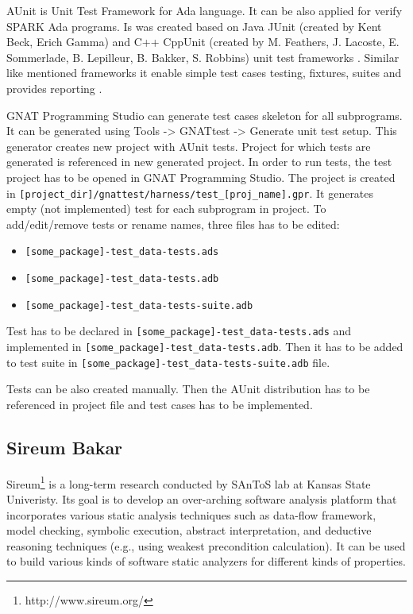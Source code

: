 AUnit is Unit Test Framework for Ada language. It can be also applied for verify SPARK Ada programs. Is was created based on Java JUnit (created by Kent Beck, Erich Gamma) and C++ CppUnit (created by M. Feathers, J. Lacoste, E. Sommerlade, B. Lepilleur, B. Bakker, S. Robbins) unit test frameworks \cite{AUnitCookbook:Online}. Similar like mentioned frameworks it enable simple test cases testing, fixtures, suites and provides reporting \cite{AUnitTutorials:Online}.

GNAT Programming Studio can generate test cases skeleton for all subprograms. It can be generated using Tools -> GNATtest -> Generate unit test setup. This generator creates new project with AUnit tests. Project for which tests are generated is referenced in new generated project. In order to run tests, the test project has to be opened in GNAT Programming Studio. The project is created in \lstinline{[project_dir]/gnattest/harness/test_[proj_name].gpr}. It generates empty (not implemented) test for each subprogram in project. To add/edit/remove tests or rename names, three files has to be edited:

\begin{itemize}
    \item \lstinline{[some_package]-test_data-tests.ads}
    \item \lstinline{[some_package]-test_data-tests.adb}
    \item \lstinline{[some_package]-test_data-tests-suite.adb}
\end{itemize}

Test has to be declared in \lstinline{[some_package]-test_data-tests.ads} and implemented in \lstinline{[some_package]-test_data-tests.adb}. Then it has to be added to test suite in \lstinline{[some_package]-test_data-tests-suite.adb} file.

Tests can be also created manually. Then the AUnit distribution has to be referenced in project file and test cases has to be implemented.


\subsection{Sireum Bakar}
\label{background:spark:sireum}

Sireum\footnote{http://www.sireum.org/} is a long-term research conducted by SAnToS lab at Kansas State Univeristy. Its goal is to develop an over-arching software analysis platform that incorporates various static analysis techniques such as data-flow framework, model checking, symbolic execution, abstract interpretation, and deductive reasoning techniques (e.g., using weakest precondition calculation). It can be used to build various kinds of software static analyzers for different kinds of properties. 

